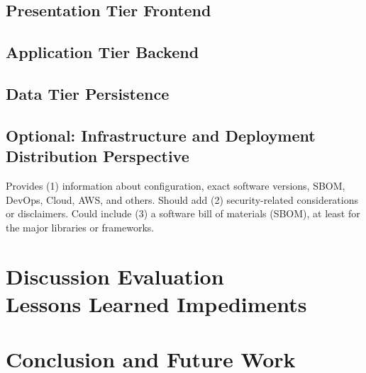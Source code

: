 \documentclass[conference,a4paper,flushend]{cs-techrep}
\begin{document}
\subsection{Presentation Tier \textbar{} Frontend}
\lipsum[13]

\subsection{Application Tier \textbar{} Backend \textbar{} }
\lipsum[14]

\subsection{Data Tier \textbar{} Persistence}
\lipsum[15]

\subsection{Optional: Infrastructure and Deployment \textbar{} Distribution Perspective \textbar{} }
Provides (1) information about configuration, exact software versions, SBOM, DevOps, Cloud, AWS, and others.
Should add (2) security-related considerations or disclaimers.
Could include (3) a software bill of materials (SBOM), at least for the major libraries or frameworks.


\section{Discussion \textbar{} Evaluation \textbar{} \\ Lessons Learned \textbar{} Impediments}
\lipsum[16]

\section{Conclusion and Future Work \textbar{} \\ }
\lipsum[17]

\nocite{LeNe24vocattllm} %
\nocite{PANP23seccloudfogai} %
\nocite{StNe23foodfresh} %
\nocite{NeLe13adhocCoop}
\nocite{Neumann2012lni}
\nocite{NeLe12alphaFlow}
\nocite{NeHL12hydra}
\nocite{NeWL12offsync}
\nocite{WaNe12alphaoffsync} %
\nocite{NSWL11alphaadaptive}
\nocite{ToNe11alphaprops} %
\nocite{JBN+10fcmdb} %
\nocite{FDI+10esmmog} %
\nocite{NeFL10oxdbs}
\nocite{NeLe10alphaUC}
\nocite{ILN+09semrttx} %
\nocite{NHSL09oxdbs} %
\nocite{NeLe09alphaflow}
\nocite{NeLe09dmps}
\nocite{NeWL09xdsrig} %
\nocite{NRDL09deus}
\nocite{IND+09lzatav} %
\nocite{MeNe04testejb} %
\end{document}

